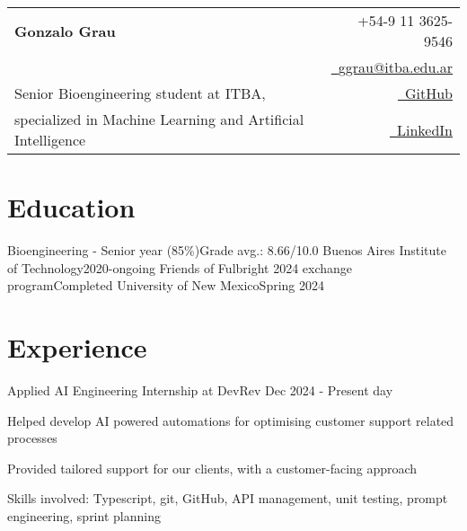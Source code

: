 \documentclass{resume}
\makeatletter
\newcommand{\name}{Gonzalo Grau} %
\renewcommand{\phone}{9 11 3625-9546} %
\newcommand{\emaila}{ggrau@itba.edu.ar} %
\makeatother
\begin{document}
    \selectfont

    {
        \begin{tabularx}{\linewidth}{L r}
            \\
            \textbf{\Huge \name} & {\raisebox{0.0\height}{\footnotesize \faPhone}\ +54-\phone}\\
            & \href{mailto:\emaila}{\raisebox{0.0\height}{\footnotesize \faEnvelope}\ {\emaila}} \\
            Senior Bioengineering student at ITBA, &
            \href{https://github.com/gonzagrau}{\raisebox{0.0\height}{\footnotesize \faGithub}\ {GitHub}} \\
            specialized in Machine Learning and Artificial Intelligence &
            \href{https://www.linkedin.com/in/gonzalo-grau/}
            {\raisebox{0.0\height}{\footnotesize \faLinkedin}\ {LinkedIn}}
        \end{tabularx}
    }




    \section{\textbf{Education}} \label{sec:education}
    \resumeSubHeadingListStart
    \resumeSubheading
    {Bioengineering - Senior year (85\%)}{Grade avg.: 8.66/10.0}
    {Buenos Aires Institute of Technology}{2020-ongoing}
    \resumeSubheading
    {Friends of Fulbright 2024 exchange program}{Completed}
    {University of New Mexico}{Spring 2024}
    \resumeSubHeadingListEnd

    \vspace{-5mm}


    \section{\textbf{Experience}} \label{sec:experience}
    \resumeSubHeadingListStart
    \resumeSubheading
    {Applied AI Engineering Internship at DevRev}
    {}{}{Dec 2024 - Present day}
    \vspace{-5mm}
    \resumeItemListStart
    \item
    {Helped develop AI powered automations for optimising
    customer support related processes}
    \item {Provided tailored support for our clients, with a customer-facing approach}
    \item {Skills involved: Typescript, git, GitHub, API management, unit testing, prompt engineering, sprint planning}
    \resumeItemListEnd
\end{document}
